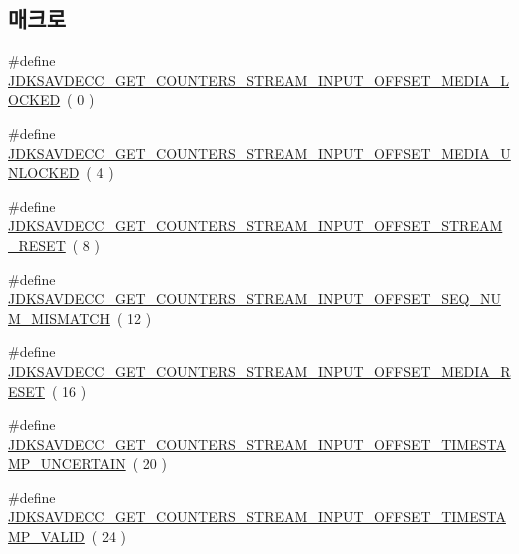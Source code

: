 \subsection*{매크로}
\begin{DoxyCompactItemize}
\item 
\#define \hyperlink{group__get__counters__stream__input_gaea1180a34537b310cf545d7680a9d896}{J\+D\+K\+S\+A\+V\+D\+E\+C\+C\+\_\+\+G\+E\+T\+\_\+\+C\+O\+U\+N\+T\+E\+R\+S\+\_\+\+S\+T\+R\+E\+A\+M\+\_\+\+I\+N\+P\+U\+T\+\_\+\+O\+F\+F\+S\+E\+T\+\_\+\+M\+E\+D\+I\+A\+\_\+\+L\+O\+C\+K\+ED}~( 0 )
\item 
\#define \hyperlink{group__get__counters__stream__input_gaea9106e9eaae6ca016f0983bdc0ec965}{J\+D\+K\+S\+A\+V\+D\+E\+C\+C\+\_\+\+G\+E\+T\+\_\+\+C\+O\+U\+N\+T\+E\+R\+S\+\_\+\+S\+T\+R\+E\+A\+M\+\_\+\+I\+N\+P\+U\+T\+\_\+\+O\+F\+F\+S\+E\+T\+\_\+\+M\+E\+D\+I\+A\+\_\+\+U\+N\+L\+O\+C\+K\+ED}~( 4 )
\item 
\#define \hyperlink{group__get__counters__stream__input_gafc2ab166b4aa357f1c5b65269412f2e6}{J\+D\+K\+S\+A\+V\+D\+E\+C\+C\+\_\+\+G\+E\+T\+\_\+\+C\+O\+U\+N\+T\+E\+R\+S\+\_\+\+S\+T\+R\+E\+A\+M\+\_\+\+I\+N\+P\+U\+T\+\_\+\+O\+F\+F\+S\+E\+T\+\_\+\+S\+T\+R\+E\+A\+M\+\_\+\+R\+E\+S\+ET}~( 8 )
\item 
\#define \hyperlink{group__get__counters__stream__input_gaf154444020c9e4570623013c55727bc4}{J\+D\+K\+S\+A\+V\+D\+E\+C\+C\+\_\+\+G\+E\+T\+\_\+\+C\+O\+U\+N\+T\+E\+R\+S\+\_\+\+S\+T\+R\+E\+A\+M\+\_\+\+I\+N\+P\+U\+T\+\_\+\+O\+F\+F\+S\+E\+T\+\_\+\+S\+E\+Q\+\_\+\+N\+U\+M\+\_\+\+M\+I\+S\+M\+A\+T\+CH}~( 12 )
\item 
\#define \hyperlink{group__get__counters__stream__input_ga51a787631f1bc8630963183f9b450d24}{J\+D\+K\+S\+A\+V\+D\+E\+C\+C\+\_\+\+G\+E\+T\+\_\+\+C\+O\+U\+N\+T\+E\+R\+S\+\_\+\+S\+T\+R\+E\+A\+M\+\_\+\+I\+N\+P\+U\+T\+\_\+\+O\+F\+F\+S\+E\+T\+\_\+\+M\+E\+D\+I\+A\+\_\+\+R\+E\+S\+ET}~( 16 )
\item 
\#define \hyperlink{group__get__counters__stream__input_gaf3a490b7af4fa773a09dfd5e42e24ea6}{J\+D\+K\+S\+A\+V\+D\+E\+C\+C\+\_\+\+G\+E\+T\+\_\+\+C\+O\+U\+N\+T\+E\+R\+S\+\_\+\+S\+T\+R\+E\+A\+M\+\_\+\+I\+N\+P\+U\+T\+\_\+\+O\+F\+F\+S\+E\+T\+\_\+\+T\+I\+M\+E\+S\+T\+A\+M\+P\+\_\+\+U\+N\+C\+E\+R\+T\+A\+IN}~( 20 )
\item 
\#define \hyperlink{group__get__counters__stream__input_gae7bbb62036ef6a811a62920f2a12beff}{J\+D\+K\+S\+A\+V\+D\+E\+C\+C\+\_\+\+G\+E\+T\+\_\+\+C\+O\+U\+N\+T\+E\+R\+S\+\_\+\+S\+T\+R\+E\+A\+M\+\_\+\+I\+N\+P\+U\+T\+\_\+\+O\+F\+F\+S\+E\+T\+\_\+\+T\+I\+M\+E\+S\+T\+A\+M\+P\+\_\+\+V\+A\+L\+ID}~( 24 )

\end{DoxyCompactItemize}
